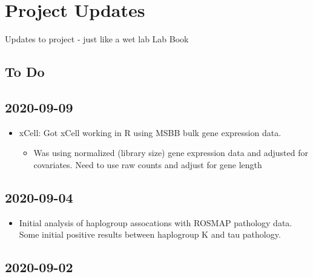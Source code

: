 \documentclass[]{book}
\providecommand{\tightlist}{%
  \setlength{\itemsep}{0pt}\setlength{\parskip}{0pt}}
\begin{document}
\hypertarget{project-updates}{%
\section{Project Updates}\label{project-updates}}

Updates to project - just like a wet lab Lab Book

\hypertarget{to-do}{%
\subsection{To Do}\label{to-do}}

\hypertarget{section}{%
\subsection{2020-09-09}\label{section}}

\begin{itemize}
\tightlist
\item
  xCell: Got xCell working in R using MSBB bulk gene expression data.

  \begin{itemize}
  \tightlist
  \item
    Was using normalized (library size) gene expression data and adjusted for covariates. Need to use raw counts and adjust for gene length
  \end{itemize}
\end{itemize}

\hypertarget{section-1}{%
\subsection{2020-09-04}\label{section-1}}

\begin{itemize}
\tightlist
\item
  Initial analysis of haplogroup assocations with ROSMAP pathology data. Some initial positive results between haplogroup K and tau pathology.
\end{itemize}

\hypertarget{section-2}{%
\subsection{2020-09-02}\label{section-2}}
\end{document}
